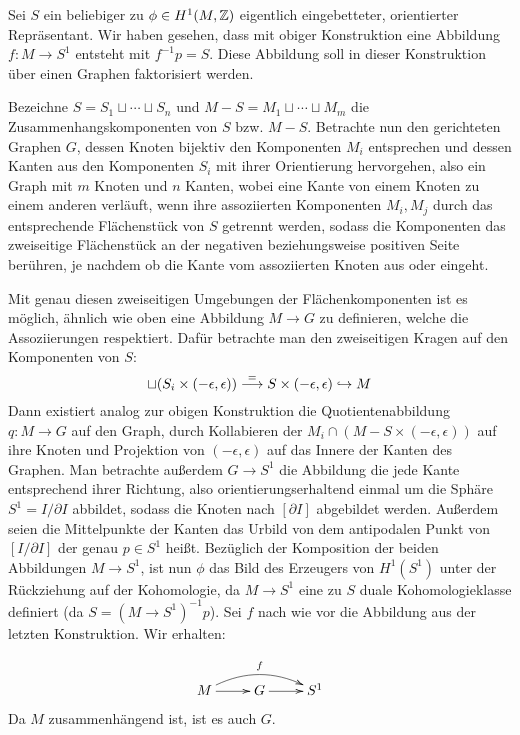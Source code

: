 \begin{constr}
	\label{constr:graph}
	Sei $S$ ein beliebiger zu $\phi \in H^1(M,\mathbb{Z})$ eigentlich eingebetteter, orientierter Repräsentant. Wir haben gesehen, dass mit obiger Konstruktion eine Abbildung $f:M\to S^1$ entsteht mit $f^{-1}p=S$. Diese Abbildung soll in dieser Konstruktion über einen Graphen faktorisiert werden.

	Bezeichne $S=S_1\sqcup \cdots \sqcup S_n$ und $M-S = M_1 \sqcup \cdots \sqcup M_m$ die Zusammenhangskomponenten von $S$ bzw. $M-S$. Betrachte nun den gerichteten Graphen $G$, dessen Knoten bijektiv den Komponenten $M_i$ entsprechen und dessen Kanten aus den Komponenten $S_i$ mit ihrer Orientierung hervorgehen, also ein Graph mit $m$ Knoten und $n$ Kanten, wobei eine Kante von einem Knoten zu einem anderen verläuft, wenn ihre assoziierten Komponenten $M_i, M_j$ durch das entsprechende Flächenstück von $S$ getrennt werden, sodass die Komponenten das zweiseitige Flächenstück an der negativen beziehungsweise positiven Seite berühren, je nachdem ob die Kante vom assoziierten Knoten aus oder eingeht.

	Mit genau diesen zweiseitigen Umgebungen der Flächenkomponenten ist es möglich, ähnlich wie oben eine Abbildung $M \to G$ zu definieren, welche die Assoziierungen respektiert. Dafür betrachte man den zweiseitigen Kragen auf den Komponenten von $S$:
	\[
		\sqcup (S_i \times (-\epsilon,\epsilon)) \stackrel = \longrightarrow S \times (-\epsilon,\epsilon) \hookrightarrow M
	\]
	Dann existiert analog zur obigen Konstruktion die Quotientenabbildung $q:M\to G$ auf den Graph, durch Kollabieren der $M_i\cap (M -S \times(-\epsilon,\epsilon))$ auf ihre Knoten und Projektion von $(-\epsilon,\epsilon)$ auf das Innere der Kanten des Graphen. Man betrachte außerdem $G \to S^1$ die Abbildung die jede Kante entsprechend ihrer Richtung, also orientierungserhaltend einmal um die Sphäre $S^1 = I/\partial I$ abbildet, sodass die Knoten nach $[\partial I]$ abgebildet werden. Außerdem seien die Mittelpunkte der Kanten das Urbild von dem antipodalen Punkt von $[I/\partial I]$ der genau $p\in S^1$ heißt. Bezüglich der Komposition der beiden Abbildungen $M \to S^1$, ist nun $\phi$ das Bild des Erzeugers von $H^1(S^1)$ unter der Rückziehung auf der Kohomologie, da $M \to S^1$ eine zu $S$ duale Kohomologieklasse definiert (da $S=(M\to S^1)^{-1}p$). Sei $f$ nach wie vor die Abbildung aus der letzten Konstruktion. Wir erhalten:
	
	\begin{align}
		\begin{xy}
				\xymatrix{M \ar[r] \ar@/^1pc/[rr]^f & G \ar[r] & S^1 }
			\end{xy}
		\label{eq:graphlift}
	\end{align}
	Da $M$ zusammenhängend ist, ist es auch $G$.
\end{constr}

